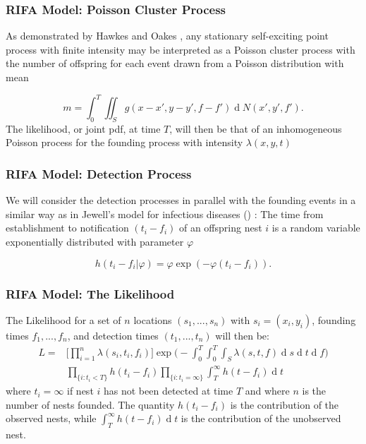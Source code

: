 \documentclass[9pt, xcolor={dvipsnames,svgnames,table}]{beamer}
\renewcommand{\d}[1]{\ensuremath{\operatorname{d}\!{#1}}}
\begin{document}
\begin{frame}
\frametitle{RIFA Model: Poisson Cluster Process}
    As demonstrated by Hawkes and Oakes \cite{Hawkes74}, any stationary self-exciting point process with finite intensity may be interpreted as a Poisson cluster process with the number of offspring for each event drawn from a Poisson distribution with mean 

    \begin{equation*}
        m = \int_0^T \iint_S g(x-x', y-y', f-f')\d N(x', y', f').
    \end{equation*}
    The likelihood, or joint pdf, at time $T$, will then be that of an inhomogeneous Poisson process for the founding process with intensity $\lambda(x, y, t)$
\end{frame}

\begin{frame}
\frametitle{RIFA Model: Detection Process}
    We will consider the detection processes in parallel with the founding events in a similar way as in Jewell's model for infectious diseases (\cite{Jewell}) : The time from establishment to notification $(t_i - f_i)$ of an offspring nest $i$ is a random variable exponentially distributed with parameter $\varphi$

    \begin{equation*}
    h(t_{i} - f_{i} | \varphi) = \varphi \exp (- \varphi(t_{i} - f_{i})).
    \end{equation*}
    
\end{frame}

\begin{frame}
\frametitle{RIFA Model: The Likelihood}
    The Likelihood for a set of $n$ locations $(s_{1}, ... , s_{n})$ with $s_i = (x_i, y_i)$, founding times $f_{1}, ... , f_{n}$, and detection times $(t_{1},  ... , t_{n})$ will then be:
    \begin{equation*} \label{eq:like}
        \begin{aligned}
            L = & \Bigg[ \prod_{i = 1}^{n} \lambda(s_{i}, t_{i}, f_{i}) \Bigg] \exp \Bigg(- \int_{0}^{T} \int_{0}^{T} \int_{S} \lambda(s, t, f) \d s \d t \d f \Bigg) \\ 
            & \prod_{\{ i : t_{i} < T \} } h(t_{i} - f_{i}) \prod_{ \{ i : t_{i} = \infty \} } \int_{T}^{\infty} h(t - f_{i}) \d t
        \end{aligned}
    \end{equation*}
    where $t_{i} = \infty$ if nest $i$ has not been detected at time $T$ and where $n$ is the number of nests founded. The quantity $h(t_{i} - f_{i})$ is the contribution of the observed nests, while $\int_{T}^{\infty} h(t - f_{i}) \d t$ is the contribution of the unobserved nest.
\end{frame}
\end{document}
